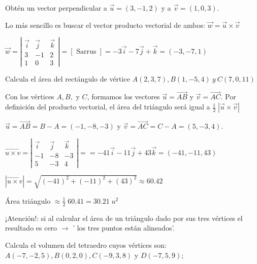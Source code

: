 \begin{ejer}
	Obtén un vector perpendicular a $\vec u=(3,-1,2)$ y  a $\vec v=(1,0,3)$.
\end{ejer}

\begin{proofw}\renewcommand{\qedsymbol}{$\diamond$}
	
	Lo más sencillo es buscar el vector producto vectorial de ambos: $ \vec w =\vec u \times \vec v$
	
	$\overrightarrow { w } =\left| \begin{matrix} \vec { i }  & \vec { j }  & \vec { k }  \\ 3 & -1 & 2 \\ 1 & 0 & 3 \end{matrix} \right| =[\text{ Sarrus }] =-3\vec { i } -7\vec { j } +\vec { k } =(-3,-7,1)$
\end{proofw}


\begin{ejer}
	Calcula el área del rectángulo de vértice  $A(2,3,7), B(1,-5,4)\  y\  C(7,0,11)$
\end{ejer}

\begin{proofw}\renewcommand{\qedsymbol}{$\diamond$}
	
	Con los vértices $A, B,$ y $C$, formamos los vectores $\vec u=\overrightarrow {AB}$ y $\vec v=\overrightarrow {AC}$. Por definición del producto vectorial, el área del triángulo será igual a $ \frac 1 2 \; | \vec u \times \vec v |$

$\vec u=\overrightarrow {AB}=B-A=(-1,-8,-3)$ y $\vec v=\overrightarrow {AC}= C-A=(5, -3, 4)$.

$\overrightarrow { u \times v } =\left| \begin{matrix} \vec { i }  & \vec { j }  & \vec { k }  \\ -1 & -8 & -3 \\ 5 & -3 & 4 \end{matrix} \right| ==-41\vec { i } -11\vec { j } +43\vec { k } =(-41,-11,43)$

$|\overrightarrow { u \times v } | = \sqrt{(-41)^2+(-11)^2+(43)^2}\approx 60.42$

Área triángulo $ \approx  \frac 1 2 \; 60.41 = 30.21\; u^2$

¡Atención!: si al calcular el área de un triángulo dado por sus tres vértices el resultado es cero $\to$ ' los tres puntos están alineados'.
\end{proofw}

\begin{ejer}
	Calcula el volumen del tetraedro cuyos vértices son: $A(-7,-2,5), B(0,2,0), C(-9,3,8)$  y $D(-7,5,9)$; 
\end{ejer}

